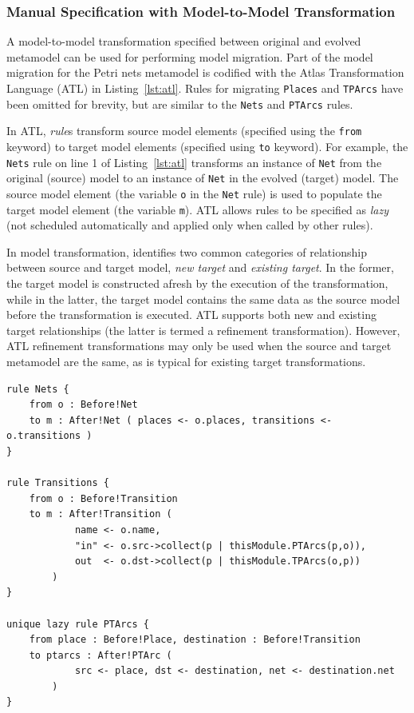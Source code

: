 \subsubsection{Manual Specification with Model-to-Model Transformation}
\label{subsubsec:m2m}

A model-to-model transformation specified between original and evolved metamodel can be used for performing model migration. Part of the model migration for the Petri nets metamodel is codified with the Atlas Transformation Language (ATL) \cite{jouault05transforming} in Listing~\ref{lst:atl}. Rules for migrating \texttt{Places} and \texttt{TPArcs} have been omitted for brevity, but are similar to the \texttt{Nets} and \texttt{PTArcs} rules.

In ATL, \emph{rule}s transform source model elements (specified using the \texttt{fr\-om} keyword) to target model elements (specified using \texttt{to} keyword). For example, the \texttt{Nets} rule on line 1 of Listing~\ref{lst:atl} transforms an instance of \texttt{Net} from the original (source) model to an instance of \texttt{Net} in the evolved (target) model. The source model element (the variable \texttt{o} in the \texttt{Net} rule) is used to populate the target model element (the variable \texttt{m}). ATL allows rules to be specified as \emph{lazy} (not scheduled automatically and applied only when called by other rules).

In model transformation, \cite{czarnecki06survey} identifies two common categories of relationship between source and target model, \emph{new target} and \emph{existing target}. In the former, the target model is constructed afresh by the execution of the transformation, while in the latter, the target model contains the same data as the source model before the transformation is executed. ATL supports both new and existing target relationships (the latter is termed a refinement transformation). However, ATL refinement transformations may only be used when the source and target metamodel are the same, as is typical for existing target transformations. 

\begin{lstlisting}[caption=Fragment of the Petri nets model migration in ATL, label=lst:atl, language=ATL]
rule Nets {
	from o : Before!Net
	to m : After!Net ( places <- o.places, transitions <- o.transitions )
}

rule Transitions {
	from o : Before!Transition
	to m : After!Transition (
			name <- o.name,
			"in" <- o.src->collect(p | thisModule.PTArcs(p,o)),
			out  <- o.dst->collect(p | thisModule.TPArcs(o,p))
		)
}

unique lazy rule PTArcs {
	from place : Before!Place, destination : Before!Transition
	to ptarcs : After!PTArc (
			src <- place, dst <- destination, net <- destination.net
		)
}
\end{lstlisting}

